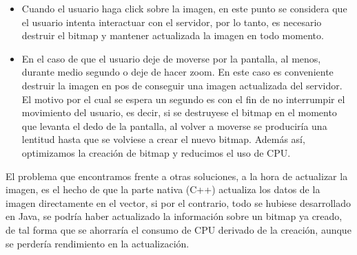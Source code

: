 \begin{itemize}
\begin{itemize}
\item Cuando el usuario haga click sobre la imagen, en este punto se considera que el usuario intenta interactuar con el servidor, por lo tanto, es necesario destruir el bitmap y mantener actualizada la imagen en todo momento.
\item En el caso de que el usuario deje de moverse por la pantalla, al menos, durante medio segundo o deje de hacer zoom. En este caso es conveniente destruir la imagen en pos de conseguir una imagen actualizada del servidor. El motivo por el cual se espera un segundo es con el fin de no interrumpir el movimiento del usuario, es decir, si se destruyese el bitmap en el momento que levanta el dedo de la pantalla, al volver a moverse se produciría una lentitud hasta que se volviese a crear el nuevo bitmap. Además así, optimizamos la creación de bitmap y reducimos el uso de CPU.
\end{itemize}

\end{itemize}

El problema que encontramos frente a otras soluciones, a la hora de actualizar la imagen, es el hecho de que la parte nativa (C++) actualiza los datos de la imagen directamente en el vector, si por el contrario, todo se hubiese desarrollado en Java, se podría haber actualizado la información sobre un bitmap ya creado, de tal forma que se ahorraría el consumo de CPU derivado de la creación, aunque se perdería rendimiento en la actualización.\\ 

